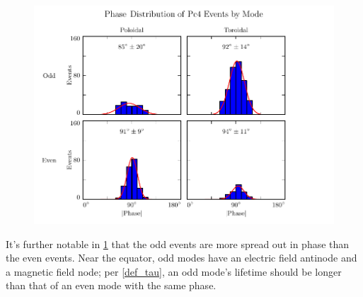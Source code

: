 \begin{figure}[!htb]
    \centering
    \includegraphics[width=\textwidth]{figures/phase.pdf}
    \caption[Phase Distribution of Pc4 Events by Mode]{
      \todo{$\cdots$}
    }
    \label{fig_phase}
\end{figure}

It's further notable in \cref{fig_phase} that the odd events are more spread out in phase than the even events. Near the equator, odd modes have an electric field antinode and a magnetic field node; per \cref{def_tau}, an odd mode's lifetime should be longer than that of an even mode with the same phase. 



